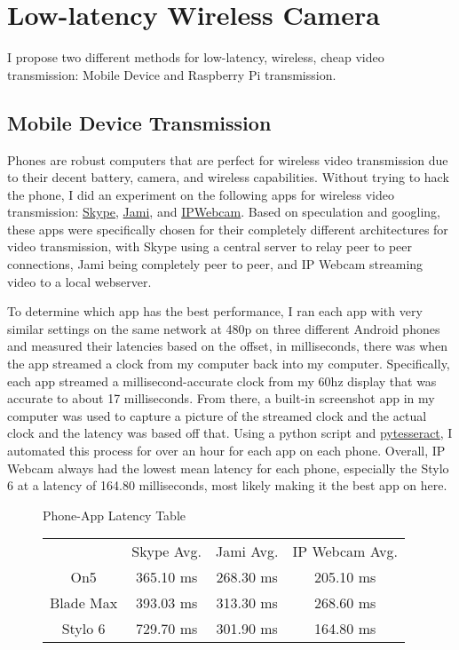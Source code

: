 ﻿\section{Low-latency Wireless Camera}

I propose two different methods for low-latency, wireless, cheap video transmission: Mobile Device and Raspberry Pi transmission. 

\subsection{Mobile Device Transmission}

Phones are robust computers that are perfect for wireless video transmission due to their decent battery, camera, and wireless capabilities. Without trying to hack the phone, I did an experiment on the following apps for wireless video transmission: \href{https://play.google.com/store/apps/details?id=com.skype.raider&hl=en_US}{Skype}, \href{https://play.google.com/store/apps/details?id=cx.ring&hl=en_US}{Jami}, and \href{https://play.google.com/store/apps/details?id=com.pas.webcam&hl=en_US}{IPWebcam}. Based on speculation and googling, these apps were specifically chosen for their completely different architectures for video transmission, with Skype using a central server to relay peer to peer connections, Jami being completely peer to peer, and IP Webcam streaming video to a local webserver.

To determine which app has the best performance, I ran each app with very similar settings on the same network at 480p on three different Android phones and measured their latencies based on the offset, in milliseconds, there was when the app streamed a clock from my computer back into my computer. Specifically, each app streamed a millisecond-accurate clock from my 60hz display that was accurate to about 17 milliseconds. From there, a built-in screenshot app in my computer was used to capture a picture of the streamed clock and the actual clock and the latency was based off that. Using a python script and \href{https://pypi.org/project/pytesseract/}{pytesseract}, I automated this process for over an hour for each app on each phone. Overall, IP Webcam always had the lowest mean latency for each phone, especially the Stylo 6 at a latency of 164.80 milliseconds, most likely making it the best app on here.

\begin{figure}[h]
\begin{centering}
Phone-App Latency Table\\[0.5cm]

\begin{tabular}{c|c|c|c}
    & Skype Avg. & Jami Avg. & IP Webcam Avg. \\[0.5cm]
    On5 & 365.10 ms & 268.30 ms & 205.10 ms \\[0.5cm]
    Blade Max & 393.03 ms & 313.30 ms & 268.60 ms \\[0.5cm]
    Stylo 6 & 729.70 ms & 301.90 ms & 164.80 ms
\end{tabular} \newline
\end{centering}
\end{figure}

